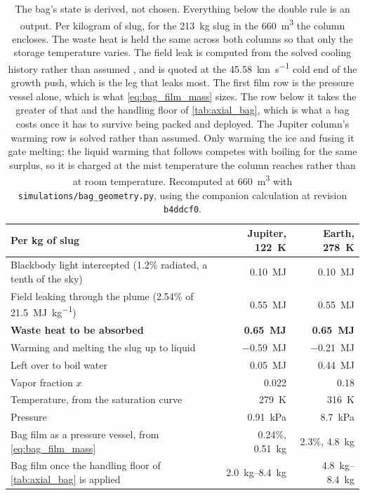 \documentclass{article}
\begin{document}
\begin{table}[!htpb]
    \centering
    \caption{The bag's state is derived, not chosen. Everything below the double rule is an output. Per kilogram of slug, for the \SI{213}{\kilogram} slug in the \SI{660}{\cubic\meter} the column encloses. The waste heat is held the same across both columns so that only the storage temperature varies. The field leak is computed from the solved cooling history rather than assumed \cite{Katz_puffsat_impact_sim_2026}, and is quoted at the \SI{45.58}{\kilo\meter\per\second} cold end of the growth push, which is the leg that leaks most. The first film row is the pressure vessel alone, which is what \autoref{eq:bag_film_mass} sizes. The row below it takes the greater of that and the handling floor of \autoref{tab:axial_bag}, which is what a bag costs once it has to survive being packed and deployed. The Jupiter column's warming row is solved rather than assumed. Only warming the ice and fusing it gate melting; the liquid warming that follows competes with boiling for the same surplus, so it is charged at the mist temperature the column reaches rather than at room temperature. Recomputed at \SI{660}{\cubic\meter} with \texttt{simulations/bag\_geometry.py}, using the companion calculation at revision \texttt{b4ddcf0}.}
    \label{tab:bag_state}
    \begin{tabular}{|l|r|r|}\hline
        \textbf{Per \si{\kilogram} of slug} & \textbf{Jupiter, \SI{122}{\kelvin}} & \textbf{Earth, \SI{278}{\kelvin}} \\\hline
        Blackbody light intercepted (1.2\% radiated, a tenth of the sky) & \SI{0.10}{\mega\joule} & \SI{0.10}{\mega\joule} \\\hline
        Field leaking through the plume (2.54\% of \SI{21.5}{\mega\joule\per\kilogram}) & \SI{0.55}{\mega\joule} & \SI{0.55}{\mega\joule} \\\hline
        \textbf{Waste heat to be absorbed} & \textbf{\SI{0.65}{\mega\joule}} & \textbf{\SI{0.65}{\mega\joule}} \\\hline
        Warming and melting the slug up to liquid & \SI{-0.59}{\mega\joule} & \SI{-0.21}{\mega\joule} \\\hline
        Left over to boil water & \SI{0.05}{\mega\joule} & \SI{0.44}{\mega\joule} \\\hline\hline
        Vapor fraction $x$ & \num{0.022} & \num{0.18} \\\hline
        Temperature, from the saturation curve & \SI{279}{\kelvin} & \SI{316}{\kelvin} \\\hline
        Pressure & \SI{0.91}{\kilo\pascal} & \SI{8.7}{\kilo\pascal} \\\hline
        Bag film as a pressure vessel, from \autoref{eq:bag_film_mass} & 0.24\%, \SI{0.51}{\kilogram} & 2.3\%, \SI{4.8}{\kilogram} \\\hline
        Bag film once the handling floor of \autoref{tab:axial_bag} is applied & \SIrange{2.0}{8.4}{\kilogram} & \SIrange{4.8}{8.4}{\kilogram} \\\hline
    \end{tabular}
\end{table}
\end{document}
